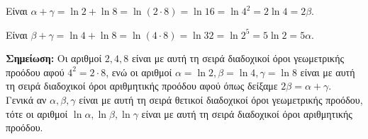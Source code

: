 \begin{alist}
\item Είναι $\alpha + \gamma = \ln 2 + \ln 8 = \ln(2\cdot 8) = \ln 16 = \ln 4^2 = 2\ln 4 = 2\beta$.
\item Είναι $\beta + \gamma = \ln 4 + \ln 8 = \ln(4\cdot 8) = \ln 32 = \ln 2^5 = 5\ln 2 = 5\alpha$.
\end{alist}
\textbf{Σημείωση:}
Οι αριθμοί $2, 4, 8$ είναι με αυτή τη σειρά διαδοχικοί όροι γεωμετρικής προόδου αφού $4^2 = 2\cdot 8$, ενώ οι αριθμοί $\alpha = \ln 2, \beta = \ln 4, \gamma = \ln 8$ είναι με αυτή τη σειρά διαδοχικοί όροι αριθμητικής προόδου αφού όπως δείξαμε $2\beta = \alpha + \gamma$. \\
Γενικά αν $\alpha, \beta, \gamma$ είναι με αυτή τη σειρά θετικοί διαδοχικοί όροι γεωμετρικής προόδου, τότε οι αριθμοί $\ln\alpha, \ln\beta, \ln\gamma$ είναι με αυτή τη σειρά διαδοχικοί όροι αριθμητικής προόδου.

